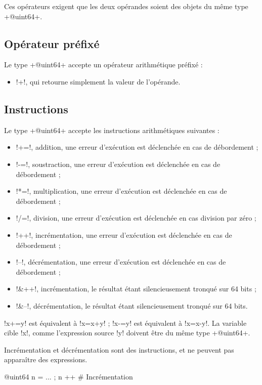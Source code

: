 Ces opérateurs exigent que les deux opérandes soient des objets du même type \ggs+@uint64+. 

\subsection{Opérateur préfixé}
Le type \ggs+@uint64+ accepte un opérateur arithmétique préfixé :
\begin{itemize}
  \item \ggs!+!, qui retourne simplement la valeur de l'opérande.
\end{itemize}

\subsection{Instructions}

Le type \ggs+@uint64+ accepte les instructions arithmétiques suivantes :
\begin{itemize}
  \item \ggs!+=!, addition, une erreur d'exécution est déclenchée en cas de débordement ;
  \item \ggs!-=!, soustraction, une erreur d'exécution est déclenchée en cas de débordement ;
  \item \ggs!*=!, multiplication, une erreur d'exécution est déclenchée en cas de débordement ;
  \item \ggs!/=!, division, une erreur d'exécution est déclenchée en cas division par zéro ;
  \item \ggs!++!, incrémentation, une erreur d'exécution est déclenchée en cas de débordement ;
  \item \ggs!--!, décrémentation, une erreur d'exécution est déclenchée en cas de débordement ;
  \item \ggs!&++!, incrémentation, le résultat étant silencieusement tronqué sur 64 bits ;
  \item \ggs!&--!, décrémentation, le résultat étant silencieusement tronqué sur 64 bits.
\end{itemize}

\ggs!x+=y! est équivalent à \ggs!x=x+y! ; \ggs!x-=y! est équivalent à \ggs!x=x-y!.
La variable cible \ggs!x!, comme l'expression source \ggs!y! doivent être du même type \ggs+@uint64+. 

Incrémentation et décrémentation sont des instructions, et ne peuvent pas apparaître des expressions.
\begin{galgas}
@uint64 n = ... ; n ++ # Incrémentation
\end{galgas}

